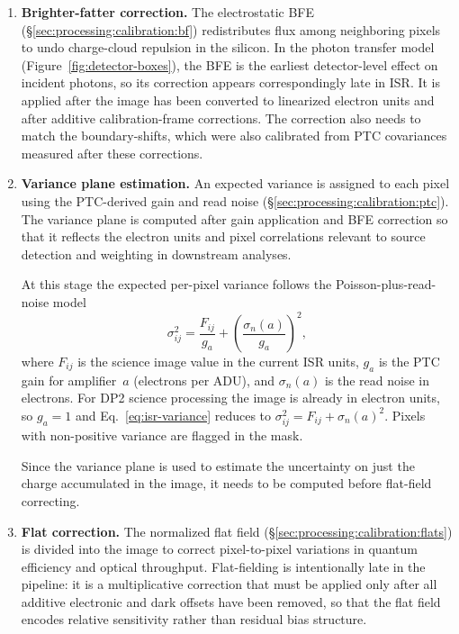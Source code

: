 \begin{enumerate}
    \item \textbf{Brighter-fatter correction.}
    The electrostatic BFE (\S\ref{sec:processing:calibration:bf}) redistributes flux among neighboring pixels to undo charge-cloud repulsion in the silicon.
    In the photon transfer model (Figure~\ref{fig:detector-boxes}), the BFE is the earliest detector-level effect on incident photons, so its correction appears correspondingly late in ISR.
    It is applied after the image has been converted to linearized electron units and after additive calibration-frame corrections.
    The correction also needs to match the boundary-shifts, which were also calibrated from PTC covariances measured after these corrections.

    \item \textbf{Variance plane estimation.}
    An expected variance is assigned to each pixel using the PTC-derived gain and read noise (\S\ref{sec:processing:calibration:ptc}).
    The variance plane is computed after gain application and BFE correction so that it reflects the electron units and pixel correlations relevant to source detection and weighting in downstream analyses.

    At this stage the expected per-pixel variance follows the Poisson-plus-read-noise model
    \begin{equation}
        \sigma^2_{ij} = \frac{F_{ij}}{g_a} + \left(\frac{\sigma_n(a)}{g_a}\right)^2,
        \label{eq:isr-variance}
    \end{equation}
    where $F_{ij}$ is the science image value in the current ISR units, $g_a$ is the PTC gain for amplifier~$a$ (electrons per ADU), and $\sigma_n(a)$ is the read noise in electrons.
    For DP2 science processing the image is already in electron units, so $g_a = 1$ and Eq.~\ref{eq:isr-variance} reduces to $\sigma^2_{ij} = F_{ij} + \sigma_n(a)^2$.
    Pixels with non-positive variance are flagged in the mask.
    
    Since the variance plane is used to estimate the uncertainty on just the charge accumulated in the image, it needs to be computed before flat-field correcting.

    \item \textbf{Flat correction.}
    The normalized flat field (\S\ref{sec:processing:calibration:flats}) is divided into the image to correct pixel-to-pixel variations in quantum efficiency and optical throughput.
    Flat-fielding is intentionally late in the pipeline: it is a multiplicative correction that must be applied only after all additive electronic and dark offsets have been removed, so that the flat field encodes relative sensitivity rather than residual bias structure.


\end{enumerate}

